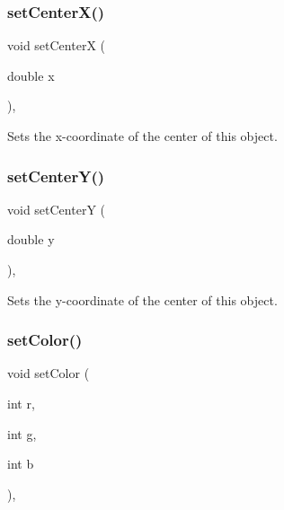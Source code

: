 \subsubsection{\texorpdfstring{set\+Center\+X()}{setCenterX()}}
{\footnotesize\ttfamily void set\+CenterX (\begin{DoxyParamCaption}\item[{double}]{x }\end{DoxyParamCaption})\hspace{0.3cm}{\ttfamily [virtual]}, {\ttfamily [inherited]}}



Sets the x-\/coordinate of the center of this object. 

\mbox{\label{classGObject_aad2a22b4fde88c33306b92aebf641d57}} 
\subsubsection{\texorpdfstring{set\+Center\+Y()}{setCenterY()}}
{\footnotesize\ttfamily void set\+CenterY (\begin{DoxyParamCaption}\item[{double}]{y }\end{DoxyParamCaption})\hspace{0.3cm}{\ttfamily [virtual]}, {\ttfamily [inherited]}}



Sets the y-\/coordinate of the center of this object. 

\mbox{\label{classGObject_ad57ef49bc31db94e92648aa3737923d6}} 
\subsubsection{\texorpdfstring{set\+Color()}{setColor()}\hspace{0.1cm}{\footnotesize\ttfamily [1/3]}}
{\footnotesize\ttfamily void set\+Color (\begin{DoxyParamCaption}\item[{int}]{r,  }\item[{int}]{g,  }\item[{int}]{b }\end{DoxyParamCaption})\hspace{0.3cm}{\ttfamily [virtual]}, {\ttfamily [inherited]}}



